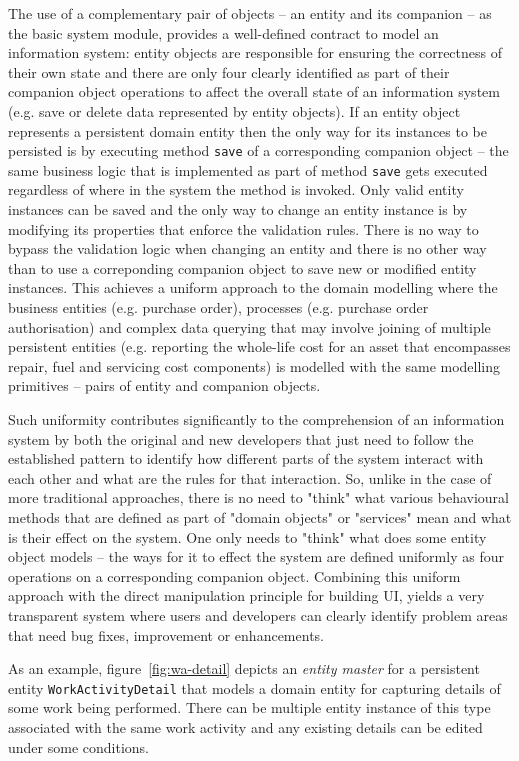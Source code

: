 \documentclass[a4paper,12pt,oneside,openright,final]{memoir} %
\begin{document}
	The use of a complementary pair of objects -- an entity and its companion -- as the basic system module, provides a well-defined contract to model an information system: entity objects are responsible for ensuring the correctness of their own state and there are only four clearly identified as part of their companion object operations to affect the overall state of an information system (e.g. save or delete data represented by entity objects).
	If an entity object represents a persistent domain entity then the only way for its instances to be persisted is by executing method \texttt{save} of a corresponding companion object -- the same business logic that is implemented as part of method \texttt{save} gets executed regardless of where in the system the method is invoked.
	Only valid entity instances can be saved and the only way to change an entity instance is by modifying its properties that enforce the validation rules.
	There is no way to bypass the validation logic when changing an entity and there is no other way than to use a correponding companion object to save new or modified entity instances.
	This achieves a uniform approach to the domain modelling where the business entities (e.g. purchase order), processes (e.g. purchase order authorisation) and complex data querying that may involve joining of multiple persistent entities (e.g. reporting the whole-life cost for an asset that encompasses repair, fuel and servicing cost components) is modelled with the same modelling primitives -- pairs of entity and companion objects.

	Such uniformity contributes significantly to the comprehension of an information system by both the original and new developers that just need to follow the established pattern to identify how different parts of the system interact with each other and what are the rules for that interaction.
	So, unlike in the case of more traditional approaches, there is no need to "think" what various behavioural methods that are defined as part of "domain objects" or "services" mean and what is their effect on the system.
	One only needs to "think" what does some entity object models -- the ways for it to effect the system are defined uniformly as four operations on a corresponding companion object.
	Combining this uniform approach with the direct manipulation principle for building UI, yields a very transparent system where users and developers can clearly identify problem areas that need bug fixes, improvement or enhancements.
	
	As an example, figure~\ref{fig:wa-detail} depicts an \emph{entity master} for a persistent entity \texttt{WorkActivityDetail} that models a domain entity for capturing details of some work being performed.
	There can be multiple entity instance of this type associated with the same work activity and any existing details can be edited under some conditions.
		
\end{document}

